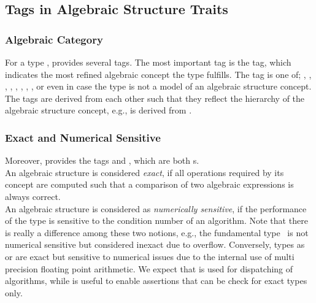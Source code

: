 \subsection{Tags in Algebraic Structure Traits}

\subsubsection{Algebraic Category}

For a type ,  
provides several tags. The most important tag is the  
tag, which indicates the most refined algebraic concept the type  
fulfills. The tag is one of; 
, , 
, , , 
, , 
, or even  
in case the type is not a model of an algebraic structure concept. 
The tags are derived from each other such that they reflect the 
hierarchy of the algebraic structure concept, e.g., 
 is derived from . \\

\subsubsection{ Exact and Numerical Sensitive}

Moreover,  provides the tags  
and , which are both s. \\
An algebraic structure is considered {\em exact},
if all operations required by its concept are computed such that a comparison 
of two algebraic expressions is always correct.\\
An algebraic structure is  considered as {\em numerically sensitive},
if the performance of the type is sensitive to the condition number of an 
algorithm.
Note that there is really a difference among these two notions, 
e.g., the fundamental type \ is not numerical sensitive but 
considered inexact due to overflow. 
Conversely, types as  or  are exact but sensitive 
to numerical issues due to the internal use of multi precision floating point 
arithmetic. We expect that  is used for dispatching
 of algorithms, while  is useful to enable assertions that can be 
check for exact types only.


